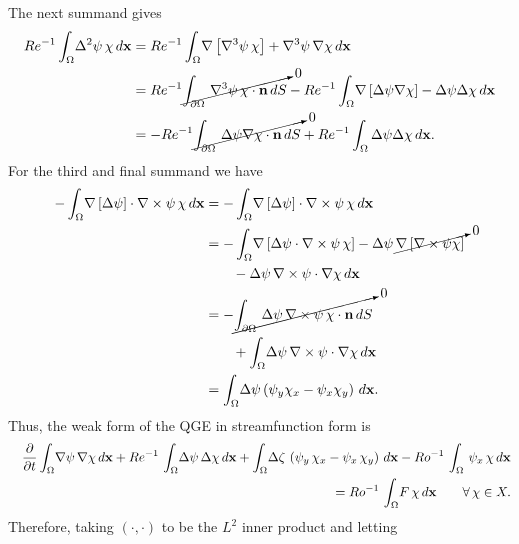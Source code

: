 The next summand gives
\begin{align*}
  Re^{-1}\int_{\Omega}\! \Delta^2 \psi\, \chi \, d\mathbf{x} &= Re^{-1}\int_{\Omega}\! \nabla\left[
    \nabla^3 \psi \, \chi \right] + \nabla^3 \psi\, \nabla \chi \, d\mathbf{x} \\
  &= Re^{-1}\cancelto{0}{\int_{\partial\Omega}\, \nabla^3 \psi\, \chi\cdot \mathbf{n}
    \, dS} - Re^{-1}\int_{\Omega}\! \nabla\left[ \Delta\psi \nabla \chi \right] - \Delta
    \psi \Delta \chi \, d\mathbf{x} \\
  &= -Re^{-1} \cancelto{0}{\int_{\partial\Omega}\, \Delta\psi \nabla \chi \cdot
    \mathbf{n}\, dS} + Re^{-1} \int_{\Omega} \Delta \psi \Delta \chi \,
    d\mathbf{x}.
\end{align*}
For the third and final summand we have
\begin{align*}
  -\int_{\Omega}\! \nabla\left[ \Delta\psi\right]\cdot
    \nabla\times\psi \, \chi \, d\mathbf{x} &= -\int_{\Omega}\!
    \nabla\left[\Delta\psi\right]\cdot \nabla\times\psi \, \chi\, d\mathbf{x}\\
  &= -\int_{\Omega}\! \nabla\left[ \Delta\psi \cdot \nabla\times\psi\, \chi
    \right] -\Delta\psi\, \cancelto{0}{\nabla\left[ \nabla\times\psi \chi
    \right]} \\
      &\qquad - \Delta\psi\, \nabla\times\psi \cdot \nabla\chi \, d\mathbf{x} \\
  &= -\cancelto{0}{\int_{\partial\Omega}\, \Delta\psi \, \nabla\times\psi\, \chi
    \cdot \mathbf{n} \, dS} \\
    &\qquad + \int_{\Omega}\! \Delta \psi \, \nabla\times \psi \cdot
      \nabla \chi \, d\mathbf{x} \\
  &= \int_{\Omega}\! \Delta\psi\left( \psi_y\chi_x - \psi_x\chi_y \right)\, d\mathbf{x}.
\end{align*}
Thus, the weak form of the QGE in streamfunction form is
\begin{eqnarray}
  && \frac{\partial}{\partial t} \int_{\Omega}\! \nabla \psi\, \nabla \chi  \, d\mathbf{x}
    + Re^{-1} \, \int_{\Omega}\! \Delta \psi \, \Delta \chi \, d{\bf x} + \int_{\Omega}\! \Delta
    \zeta \, \left( \psi_y \, \chi_x - \psi_x \, \chi_y \right)\, d{\bf x} - Ro^{-1} \, \int_{\Omega}
    \, \psi_x \, \chi \, d{\bf x} \nonumber \\
  && \hspace*{3.0cm} = Ro^{-1}\, \int_{\Omega}\! F \, \chi \, d{\bf x} \qquad \forall \, \chi \in X .
\label{eqn:qge_psi_weak}
\end{eqnarray}
Therefore, taking $(\cdot,\cdot)$ to be the $L^2$ inner product and letting

